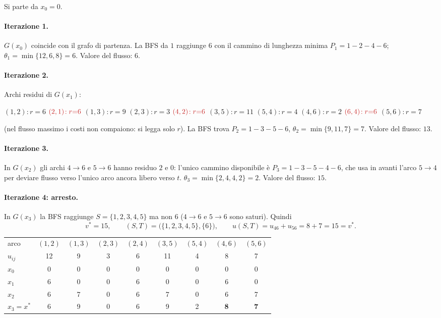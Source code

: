\documentclass[11pt,a4paper]{article}
\newcommand{\rdm}[3]{\mbox{$(#1,#2)\!:r{=}#3$}\hspace{1.1em}}
\newcommand{\rim}[3]{\mbox{$\textcolor{neg}{(#1,#2)\!:r{=}#3}$}\hspace{1.1em}}
\newenvironment{resid}{\par\smallskip\noindent\small\raggedright\ignorespaces}{\par\smallskip\noindent}
\begin{document}
\begin{sol}
Si parte da $x_0=0$.

\paragraph{Iterazione 1.} $G(x_0)$ coincide con il grafo di partenza. La BFS da $1$ raggiunge $6$
con il cammino di lunghezza minima $P_1=1\!-\!2\!-\!4\!-\!6$;
$\theta_1=\min\{12,6,8\}=6$. Valore del flusso: $6$.

\paragraph{Iterazione 2.} Archi residui di $G(x_1)$:
\begin{resid}
\rdm{1}{2}{6} \rim{2}{1}{6} \rdm{1}{3}{9} \rdm{2}{3}{3} \rim{4}{2}{6}
\rdm{3}{5}{11} \rdm{5}{4}{4} \rdm{4}{6}{2} \rim{6}{4}{6} \rdm{5}{6}{7}
\end{resid}
(nel flusso massimo i costi non compaiono: si legga solo $r$).
La BFS trova $P_2=1\!-\!3\!-\!5\!-\!6$, $\theta_2=\min\{9,11,7\}=7$. Valore del flusso: $13$.

\paragraph{Iterazione 3.} In $G(x_2)$ gli archi $4\to6$ e $5\to6$ hanno residuo $2$ e $0$:
l'unico cammino disponibile è $P_3=1\!-\!3\!-\!5\!-\!4\!-\!6$, che usa in avanti l'arco $5\to4$
per deviare flusso verso l'unico arco ancora libero verso $t$.
$\theta_3=\min\{2,4,4,2\}=2$. Valore del flusso: $15$.

\paragraph{Iterazione 4: arresto.} In $G(x_3)$ la BFS raggiunge $S=\{1,2,3,4,5\}$ ma non $6$
($4\to6$ e $5\to6$ sono saturi). Quindi
\[
 v^\ast=15,\qquad (S,T)=\bigl(\{1,2,3,4,5\},\{6\}\bigr),\qquad u(S,T)=u_{46}+u_{56}=8+7=15=v^\ast .
\]

\begin{center}\small
\begin{tabular}{@{}lcccccccc@{}}
\toprule
arco & $(1,2)$ & $(1,3)$ & $(2,3)$ & $(2,4)$ & $(3,5)$ & $(5,4)$ & $(4,6)$ & $(5,6)$\\
$u_{ij}$ & 12 & 9 & 3 & 6 & 11 & 4 & 8 & 7\\
\midrule
$x_0$ & 0 & 0 & 0 & 0 & 0 & 0 & 0 & 0\\
$x_1$ & 6 & 0 & 0 & 6 & 0 & 0 & 6 & 0\\
$x_2$ & 6 & 7 & 0 & 6 & 7 & 0 & 6 & 7\\
$x_3=x^\ast$ & 6 & 9 & 0 & 6 & 9 & 2 & \textbf{8} & \textbf{7}\\
\bottomrule
\end{tabular}
\end{center}


\end{sol}
\end{document}
